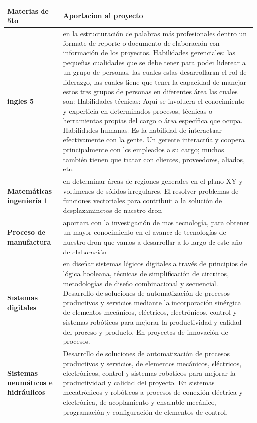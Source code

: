 \documentclass[11pt,a4paper]{article}
\begin{document}
\begin{tabular}{|p{5cm}|p{8.5cm}|}
\hline 
\textbf{Materias de 5to} & \textbf{Aportacion al proyecto} \\ \hline
\textbf{ingles 5} & en la estructuración de palabras más profesionales dentro un formato de reporte o documento de elaboración con información de los proyectos.
Habilidades gerenciales: las pequeñas cualidades que se debe tener para poder liderear a un grupo de personas, las cuales estas desarrollaran el rol de liderazgo, las cuales tiene que tener la capacidad de manejar estos tres grupos de personas en diferentes área las cuales son:  
Habilidades técnicas: Aquí se involucra el conocimiento y experticia en determinados procesos, técnicas o herramientas propias del cargo o área específica que ocupa.
Habilidades humanas:
Es la habilidad de interactuar efectivamente con la gente. Un gerente interactúa y coopera principalmente con los empleados a su cargo; muchos también tienen que tratar con clientes, proveedores, aliados, etc.
 \\ \hline
\textbf{Matemáticas ingeniería 1} & en determinar  áreas de regiones generales en el plano XY y volúmenes de sólidos irregulares. El resolver problemas de funciones vectoriales para contribuir a la solución de desplazaminetos de nuestro dron  \\ \hline
\textbf{Proceso de manufactura} & aportara con la investigación de mas tecnología, para obtener un mayor conocimiento en el avance de tecnologías de nuestro dron que vamos a desarrollar a lo largo de este año de elaboración. \\ \hline
\textbf{Sistemas digitales} & en diseñar sistemas lógicos digitales a través de principios de lógica booleana, técnicas de simplificación de circuitos, metodologías de diseño combinacional y secuencial. Desarrollo de soluciones de automatización de procesos productivos y servicios mediante la incorporación sinérgica de elementos mecánicos, eléctricos, electrónicos, control y sistemas robóticos para mejorar la productividad y calidad del proceso y producto. En proyectos de innovación de procesos.  \\ \hline
\textbf{Sistemas neumáticos e hidráulicos} & Desarrollo de soluciones de automatización de procesos productivos y servicios, de elementos mecánicos, eléctricos, electrónicos, control y sistemas robóticos para mejorar la productividad y calidad del proyecto. En sistemas mecatrónicos y robóticos a procesos  de conexión eléctrica y electrónica, de acoplamiento y ensamble mecánico, programación y configuración de elementos de control.  \\ \hline

\end{tabular}
\end{document}
